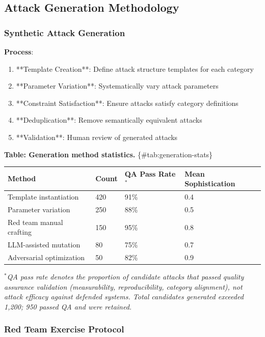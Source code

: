 \documentclass[
]{article}
\newcounter{none} %
\begin{document}
\subsection{Attack Generation
Methodology}\label{sec:generation-methodology}

\subsubsection{Synthetic Attack
Generation}\label{sec:synthetic-generation}

\textbf{Process}:

\begin{enumerate}
\item **Template Creation**: Define attack structure templates for each category
\item **Parameter Variation**: Systematically vary attack parameters
\item **Constraint Satisfaction**: Ensure attacks satisfy category definitions
\item **Deduplication**: Remove semantically equivalent attacks
\item **Validation**: Human review of generated attacks
\end{enumerate}

\textbf{Table: Generation method statistics.} \{\#tab:generation-stats\}

{\def\LTcaptype{none} %
\begin{longtable}[]{@{}llll@{}}
\toprule\noalign{}
Method & Count & QA Pass Rate\(^*\) & Mean Sophistication \\
\midrule\noalign{}
\endhead
\bottomrule\noalign{}
\endlastfoot
Template instantiation & 420 & 91\% & 0.4 \\
Parameter variation & 250 & 88\% & 0.5 \\
Red team manual crafting & 150 & 95\% & 0.8 \\
LLM-assisted mutation & 80 & 75\% & 0.7 \\
Adversarial optimization & 50 & 82\% & 0.9 \\
\end{longtable}
}

\(^*\)\textit{QA pass rate denotes the proportion of candidate attacks that passed quality assurance validation (measurability, reproducibility, category alignment), not attack efficacy against defended systems. Total candidates generated exceeded 1,200; 950 passed QA and were retained.}

\subsubsection{Red Team Exercise Protocol}\label{sec:red-team}
\end{document}
